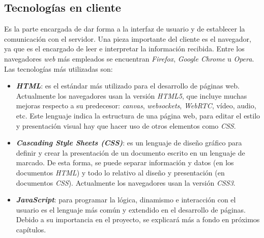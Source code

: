 \subsection{Tecnologías en cliente}
\label{subsec:tecclient}
Es la parte encargada de dar forma a la interfaz de usuario y de establecer la comunicación con el servidor. Una pieza importante del cliente es el navegador, ya que es el encargado de leer e interpretar la información recibida. Entre los navegadores \textit{web} más empleados se encuentran \textit{Firefox}, \textit{Google Chrome} u \textit{Opera}\cite{bib:navegadores}. Las tecnologías más utilizadas son: 
\begin{itemize}
    \item \textit{\textbf{HTML}}: es el estándar más utilizado para el desarrollo de páginas web. Actualmente los navegadores usan la versión \textit{HTML5}, que incluye muchas mejoras respecto a su predecesor: \textit{canvas}, \textit{websockets}, \textit{WebRTC}, vídeo, audio, etc. Este lenguaje indica la estructura de una página web, para editar el estilo y presentación visual hay que hacer uso de otros elementos como \textit{CSS}.
    \item \textit{\textbf{Cascading Style Sheets (CSS)}}:  es un lenguaje de diseño gráfico para definir y crear la presentación de un documento escrito en un lenguaje de marcado. De esta forma, se puede separar información y datos (en los documentos \textit{HTML}) y todo lo relativo al diseño y presentación (en documentos \textit{CSS}). Actualmente los navegadores usan la versión \textit{CSS3}.
    \item \textit{\textbf{JavaScript}}: para programar la lógica, dinamismo e interacción con el usuario es el lenguaje más común y extendido en el desarrollo de páginas. Debido a su importancia en el proyecto, se explicará más a fondo en próximos capítulos. 
\end{itemize}

